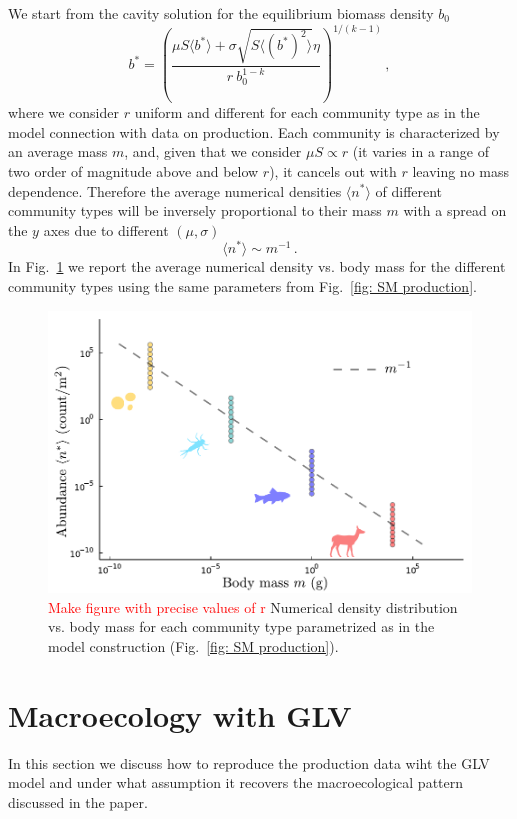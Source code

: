 \documentclass[10pt]{article}
\begin{document}
We start from the cavity solution for the equilibrium biomass density $b_0$
\begin{equation}
    b^* = \left(\frac{\mu S \langle b^* \rangle + \sigma \sqrt{S\langle (b^*)^2\rangle} \eta}
    {r \ b_0^{1-k}}\right)^{1/(k-1)} \, ,
\end{equation}
where we consider $r$ uniform and different for each community type as in the model
connection with data on production.
Each community is characterized by an average mass $m$, and, given that we consider
$\mu S \propto r$ (it varies in a range of two order of magnitude above and below $r$),
it cancels out with $r$ leaving no mass dependence.
Therefore the average numerical densities $\langle n^*\rangle$ 
of different community types will
be inversely proportional to their mass $m$ with a spread on the $y$ axes
due to different $(\mu, \sigma)$
\begin{equation}
    \langle n^*\rangle \sim m^{-1} \, .
\end{equation}
In Fig.~\ref{fig: SM size-density scaling} we report the average numerical density vs. 
body mass for the different community types using the same 
parameters from Fig.~\ref{fig: SM production}.

\begin{figure}[h!]
    \centering
    \includegraphics[width=.8\textwidth]{fig/SM-size-density-scaling.pdf}
    \caption{\textcolor{red}{Make figure with precise values of r} Numerical density distribution vs. body mass for each community 
     type parametrized as in the model construction (Fig.~\ref{fig: SM production}).}
    \label{fig: SM size-density scaling}
\end{figure}

\section{Macroecology with GLV}
In this section we discuss how to reproduce the production data
wiht the GLV model and under what assumption it recovers the macroecological
pattern discussed in the paper.
\end{document}
